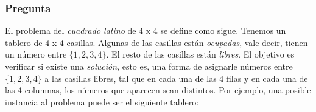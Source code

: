 \documentclass[12pt]{article}
\begin{document}






\newpage


\subsubsection*{Pregunta }

El problema del \textit{cuadrado latino} de 4 x 4 se define como sigue. Tenemos un 
tablero de 4 x 4 casillas. Algunas de las casillas están \textit{ocupadas}, vale decir, tienen un
número entre $\{1, 2, 3, 4\}$. El resto de las casillas están \textit{libres}. El objetivo es verificar
si existe una \textit{solución}, esto es, una forma de asignarle números entre $\{1, 2, 3, 4\}$ a las
casillas libres, tal que en cada una de las 4 filas y en cada una de las 4 columnas, los números 
que aparecen sean distintos. Por ejemplo, una posible instancia al problema puede ser el siguiente tablero:
\end{document}
